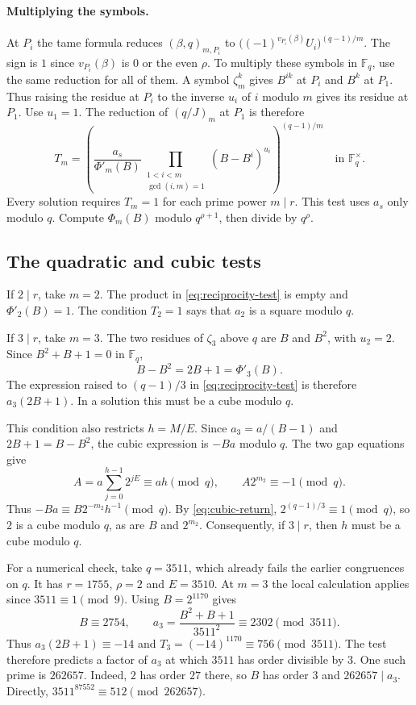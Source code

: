 \documentclass[11pt]{article}
\begin{document}
\paragraph{Multiplying the symbols.}
At $P_i$ the tame formula reduces $(\beta,q)_{m,P_i}$ to
$\bigl((-1)^{v_{P_i}(\beta)}U_i\bigr)^{(q-1)/m}$.
The sign is $1$ since $v_{P_i}(\beta)$ is $0$ or the even $\rho$.
To multiply these symbols in $\mathbb F_q$, use the same reduction
for all of them. A symbol $\zeta_m^k$ gives $B^{ik}$ at $P_i$
and $B^k$ at $P_1$. Thus raising the residue at $P_i$ to the
inverse $u_i$ of $i$ modulo $m$ gives its residue at $P_1$.
Use $u_1=1$. The reduction of $(q/J)_m$ at $P_1$ is therefore
\begin{equation}\label{eq:reciprocity-test}
T_m=
\left(
\frac{a_s}{\Phi'_m(B)}
\prod_{\substack{1<i<m\\ \gcd(i,m)=1}}(B-B^i)^{u_i}
\right)^{(q-1)/m}
\quad\text{in }\mathbb F_q^\times.
\end{equation}
Every solution requires $T_m=1$ for each prime power $m\mid r$.
This test uses $a_s$ only modulo $q$. Compute $\Phi_m(B)$ modulo
$q^{\rho+1}$, then divide by $q^\rho$.

\subsection{The quadratic and cubic tests}

If $2\mid r$, take $m=2$. The product in \eqref{eq:reciprocity-test} is empty
and $\Phi'_2(B)=1$. The condition $T_2=1$ says that $a_2$ is a
square modulo $q$.

If $3\mid r$, take $m=3$. The two residues of $\zeta_3$ above $q$ are $B$ and $B^2$,
with $u_2=2$. Since $B^2+B+1=0$ in $\mathbb F_q$,
\[
B-B^2=2B+1=\Phi'_3(B).
\]
The expression raised to $(q-1)/3$ in \eqref{eq:reciprocity-test}
is therefore $a_3(2B+1)$. In a solution this must be a cube modulo $q$.

This condition also restricts $h=M/E$. Since $a_3=a/(B-1)$ and
$2B+1=B-B^2$, the cubic expression is $-Ba$ modulo $q$.
The two gap equations give
\[
A=a\sum_{j=0}^{h-1}2^{jE}\equiv ah\pmod q,\qquad
A2^{m_2}\equiv-1\pmod q.
\]
Thus $-Ba\equiv B2^{-m_2}h^{-1}\pmod q$.
By \eqref{eq:cubic-return}, $2^{(q-1)/3}\equiv1\pmod q$, so
$2$ is a cube modulo $q$, as are $B$ and $2^{m_2}$.
Consequently, if $3\mid r$, then $h$ must be a cube modulo $q$.

For a numerical check, take $q=3511$, which already fails
the earlier congruences on $q$. It has $r=1755$, $\rho=2$ and
$E=3510$. At $m=3$ the local calculation applies since
$3511\equiv1\pmod9$. Using $B=2^{1170}$ gives
\[
B\equiv2754,\qquad
a_3=\frac{B^2+B+1}{3511^2}\equiv2302\pmod{3511}.
\]
Thus $a_3(2B+1)\equiv-14$ and $T_3=(-14)^{1170}\equiv756\pmod{3511}$.
The test therefore predicts a factor of $a_3$ at which $3511$ has
order divisible by $3$. One such prime is $262657$.
Indeed, $2$ has order $27$ there, so $B$ has order $3$ and
$262657\mid a_3$. Directly, $3511^{87552}\equiv512\pmod{262657}$.
\end{document}
